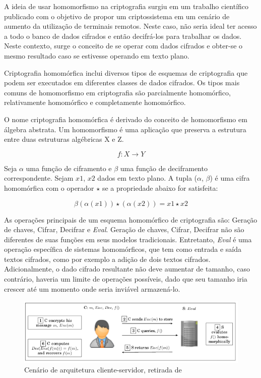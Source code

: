 \documentclass{ufsctex/ufsctex}
\begin{document}
A ideia de usar homomorfismo na criptografia surgiu em um trabalho científico
publicado com o objetivo de propor um criptossistema em um cenário de aumento
da utilização de terminais remotos. Neste caso, não seria ideal ter acesso a
todo o banco de dados cifrados e então decifrá-los para trabalhar os dados.
Neste contexto, surge o conceito de se operar com dados cifrados e obter-se o
mesmo resultado caso se estivesse operando em texto plano. \cite{homomorphic}

Criptografia homomórfica inclui diversos tipos de esquemas de criptografia que
podem ser executados em diferentes classes de dados cifrados. Os tipos mais
comuns de homomorfismo em criptografia são parcialmente homomórfico,
relativamente homomórfico e completamente homomórfico. \cite{survey-homo}

O nome criptografia homomórfica é derivado do conceito de homomorfismo em
álgebra abstrata. Um homomorfismo é uma aplicação que preserva a estrutura
entre duas estruturas algébricas X e Z.

\begin{equation}
f : X \longrightarrow Y
\end{equation}

Seja $\alpha$ uma função de ciframento e $\beta$ uma função de deciframento
correspondente. Sejam $x1$, $x2$ dados em texto plano. A tupla ($\alpha$,
$\beta$) é uma cifra homomórfica com o operador $\star$ se a propriedade abaixo
for satisfeita:

\begin{equation}
\beta (\alpha(x1)) \star (\alpha(x2)) = x1 \star x2
\end{equation}

As operações principais de um esquema homomórfico de criptografia são: Geração
de chaves, Cifrar, Decifrar e \textit{Eval}. Geração de chaves, Cifrar,
Decifrar não são diferentes de suas funções em seus modelos tradicionais.
Entretanto, \textit{Eval} é uma operação específica de sistemas homomórficos,
que tem como entrada e saída textos cifrados, como por exemplo a adição de dois
textos cifrados.  Adicionalmente, o dado cifrado resultante não deve aumentar
de tamanho, caso contrário, haveria um limite de operações possíveis, dado que
seu tamanho iria crescer até um momento onde seria inviável armazená-lo.
\cite{survey-homo}

\begin{figure}[h]
	\centering
	\includegraphics[scale=0.4]{crypto-homo}
	\caption{Cenário de arquitetura cliente-servidor, retirada de \cite{survey-homo}}
	\label{fig:crypto-homo}
\end{figure}
\end{document}
